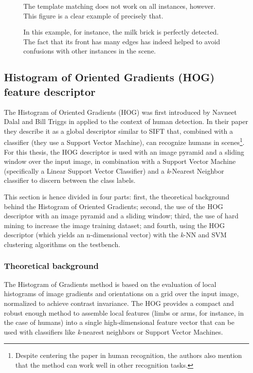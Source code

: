 \documentclass[../main.tex]{subfiles}
\begin{document}
\begin{figure}[htbp]
    \centering
    \caption{The template matching does not work on all instances, however. This figure is a clear example of precisely that.}
    \label{fig:0pepsi_testbench_TM}
\end{figure}

\begin{figure}[htbp]
    \centering
    \caption{In this example, for instance, the milk brick is perfectly detected. The fact that its front has many edges has indeed helped to avoid confusions with other instances in the scene.}
    \label{fig:5milk_testbench2_TM}
\end{figure}

\subsection{Histogram of Oriented Gradients (HOG) feature descriptor} \label{sec:HOG}
The Histogram of Oriented Gradients (HOG) was first introduced by Navneet Dalal and Bill Triggs in \cite{hog_paper} applied to the context of human detection. In their paper they describe it as a global descriptor similar to SIFT \cite{SIFTlowe2004} that, combined with a classifier (they use a Support Vector Machine), can recognize humans in scenes\footnote{Despite centering the paper in human recognition, the authors also mention that the method can work well in other recognition tasks.}. For this thesis, the HOG descriptor is used with an image pyramid and a sliding window over the input image, in combination with a Support Vector Machine (specifically a Linear Support Vector Classifier) and a \emph{k}-Nearest Neighbor classifier to discern between the class labels.

This section is hence divided in four parts: first, the theoretical background behind the Histogram of Oriented Gradients; second, the use of the HOG descriptor with an image pyramid and a sliding window; third, the use of hard mining to increase the image training dataset; and fourth, using the HOG descriptor (which yields an n-dimensional vector) with the \emph{k}-NN and SVM clustering algorithms on the testbench.

\subsubsection{Theoretical background}
The Histogram of Gradients method is based on the evaluation of local histograms of image gradients and orientations on a grid over the input image, normalized to achieve contrast invariance. The HOG provides a compact and robust enough method to assemble local features (limbs or arms, for instance, in the case of humans) into a single high-dimensional feature vector that can be used with classifiers like \emph{k}-nearest neighbors or Support Vector Machines.
\end{document}

